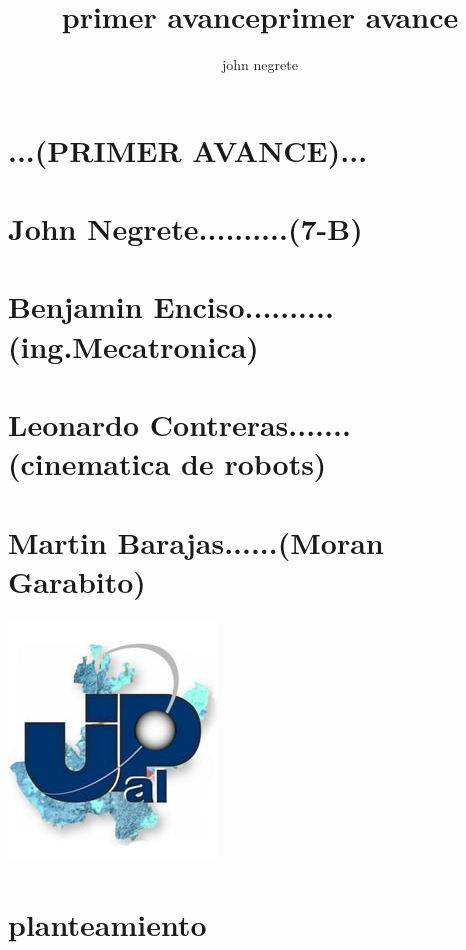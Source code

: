 \documentclass[12pt,letterpaper]{article}
\author{john negrete}
\title {primer avance}
\begin{document}
 

\title {primer avance}

\section*{                  ...(PRIMER AVANCE)... }
\section*{John Negrete..........(7-B)}
\section*{Benjamin Enciso..........(ing.Mecatronica)}
\section*{Leonardo Contreras.......(cinematica de robots)}
\section*{Martin Barajas......(Moran Garabito)}
\includegraphics[scale=1]{upz.jpg}
\newpage 
\section*{planteamiento}
\end{document}
